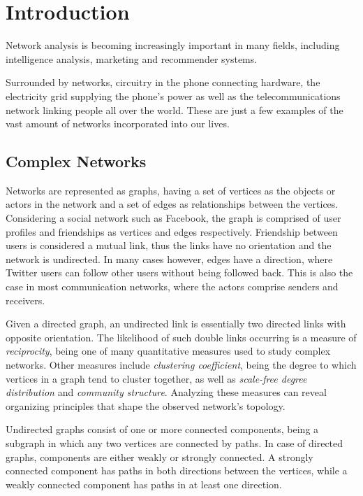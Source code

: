 \chapter{Introduction}\label{ch:Introduction}
    
Network analysis is becoming increasingly important in many fields, including intelligence analysis, marketing and recommender systems.

Surrounded by networks, circuitry in the phone connecting hardware, the electricity grid supplying the phone's power as well as the telecommunications network linking people all over the world. These are just a few examples of the vast amount of networks incorporated into our lives.

\section{Complex Networks}

    Networks are represented as graphs, having a set of vertices as the objects or actors in the network and a set of edges as relationships between the vertices. Considering a social network such as Facebook, the graph is comprised of user profiles and friendships as vertices and edges respectively. Friendship between users is considered a mutual link, thus the links have no orientation and the network is undirected. In many cases however, edges have a direction, where Twitter users can follow other users without being followed back. This is also the case in most communication networks, where the actors comprise senders and receivers. 
    
    Given a directed graph, an undirected link is essentially two directed links with opposite orientation. The likelihood of such double links occurring is a measure of \emph{reciprocity}, being one of many quantitative measures used to study complex networks. Other measures include \emph{clustering coefficient}, being the degree to which vertices in a graph tend to cluster together, as well as \emph{scale-free degree distribution} and \emph{community structure}. Analyzing these measures can reveal organizing principles that shape the observed network's topology.
    
    Undirected graphs consist of one or more connected components, being a subgraph in which any two vertices are connected by paths. 
    In case of directed graphs, components are either weakly or strongly connected. A strongly connected component has paths in both directions between the vertices, while a weakly connected component has paths in at least one direction. 
    
